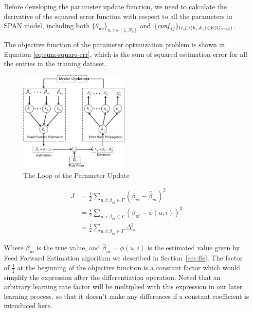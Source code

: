 Before developing the parameter update function, we need to calculate
the derivative of the squared error function with respect to all the
parameters in SPAN model, including both
$\{\theta_{uv}\}_{u,v\in[1,N_a]}$ and
$\{\mathit{conf}_{ij}\}_{(i,j):(k_i,k_j)\in E(G_{amp})}$.

The objective function of the parameter optimization problem is shown
in Equation \ref{eq:sum-square-err}, which is the sum of squared
estimation error for all the entries in the training dataset.

\begin{figure}[!ht]
  \centering
  \includegraphics[width=0.49\textwidth]{figures/trainer_train_entry.pdf}
  \caption{The Loop of the Parameter Update}
  \label{fig:trainer-train-entry}
\end{figure}

\begin{equation}
  \label{eq:sum-square-err}
  \begin{aligned}
    J &= \frac{1}{2} \sum_{u,i:\beta_{ui}\in\Gamma} \left(\beta_{ui}-\hat{\beta}_{ui}\right)^2 \\
    &= \frac{1}{2} \sum_{u,i:\beta_{ui}\in\Gamma} \left(\beta_{ui}-\phi(u,i)\right)^2 \\
    &= \frac{1}{2} \sum_{u,i:\beta_{ui}\in\Gamma} \Delta^2_{ui}
  \end{aligned}
\end{equation}

Where $\beta_{ui}$ is the true value, and $\hat{\beta}_{ui}=\phi(u,i)$
is the estimated value given by Feed Forward Estimation algorithm we
described in Section~\ref{sec:ffe}. The factor of $\frac{1}{2}$ at the
beginning of the objective function is a constant factor which would
simplify the expression after the differentiation operation. Noted
that an arbitrary learning rate factor will be multiplied with this
expression in our later learning process, so that it doesn't make any
differences if a constant coefficient is introduced here.

